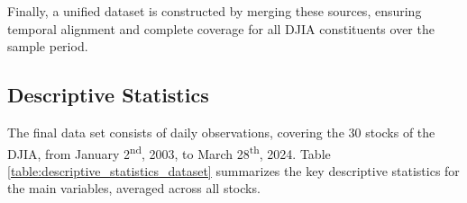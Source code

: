 Finally, a unified dataset is constructed by merging these sources, ensuring temporal alignment and complete coverage for all DJIA constituents over the sample period.

\subsection{Descriptive Statistics}
\label{sec:data_description}
The final data set consists of \datasetDJINumberOfInstances daily observations, covering the 30 stocks of the DJIA, from January 2\textsuperscript{nd}, 2003, to March 28\textsuperscript{th}, 2024. Table \ref{table:descriptive_statistics_dataset} summarizes the key descriptive statistics for the main variables, averaged across all stocks.


